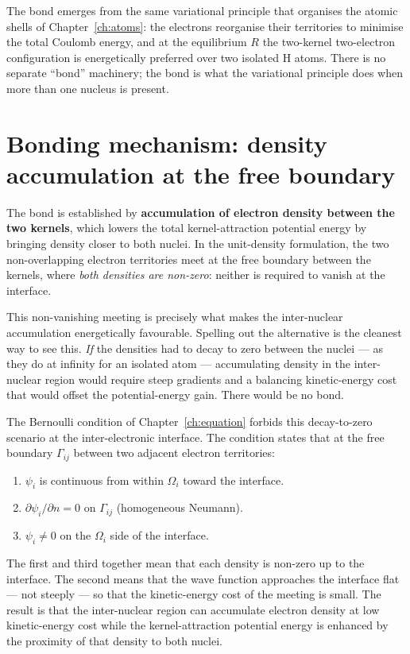 The bond emerges from the same variational principle that organises the atomic shells of Chapter~\ref{ch:atoms}: the electrons reorganise their territories to minimise the total Coulomb energy, and at the equilibrium $R$ the two-kernel two-electron configuration is energetically preferred over two isolated H atoms. There is no separate ``bond'' machinery; the bond is what the variational principle does when more than one nucleus is present.

\section{Bonding mechanism: density accumulation at the free boundary}\label{sec:bonding-mechanism}

The bond is established by \textbf{accumulation of electron density between the two kernels}, which lowers the total kernel-attraction potential energy by bringing density closer to both nuclei. In the unit-density formulation, the two non-overlapping electron territories meet at the free boundary between the kernels, where \emph{both densities are non-zero}: neither is required to vanish at the interface.

This non-vanishing meeting is precisely what makes the inter-nuclear accumulation energetically favourable. Spelling out the alternative is the cleanest way to see this. \emph{If} the densities had to decay to zero between the nuclei --- as they do at infinity for an isolated atom --- accumulating density in the inter-nuclear region would require steep gradients and a balancing kinetic-energy cost that would offset the potential-energy gain. There would be no bond.

The Bernoulli condition of Chapter~\ref{ch:equation} forbids this decay-to-zero scenario at the inter-electronic interface. The condition states that at the free boundary $\Gamma_{ij}$ between two adjacent electron territories:
\begin{enumerate}
\item $\psi_i$ is continuous from within $\Omega_i$ toward the interface.
\item $\partial \psi_i / \partial n = 0$ on $\Gamma_{ij}$ (homogeneous Neumann).
\item $\psi_i \ne 0$ on the $\Omega_i$ side of the interface.
\end{enumerate}
The first and third together mean that each density is non-zero up to the interface. The second means that the wave function approaches the interface flat --- not steeply --- so that the kinetic-energy cost of the meeting is small. The result is that the inter-nuclear region can accumulate electron density at low kinetic-energy cost while the kernel-attraction potential energy is enhanced by the proximity of that density to both nuclei.

